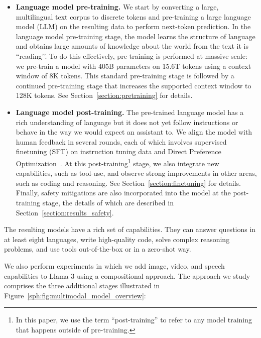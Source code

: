 \begin{itemize}

\item \textbf{Language model pre-training.} We start by converting a large, multilingual text corpus to discrete tokens and pre-training a large language model (LLM) on the resulting data to perform next-token prediction. In the language model pre-training stage, the model learns the structure of language and obtains large amounts of knowledge about the world from the text it is ``reading’’. To do this effectively, pre-training is performed at massive scale: we pre-train a model with 405B parameters on 15.6T tokens using a context window of 8K tokens. This standard pre-training stage is followed by a continued pre-training stage that increases the supported context window to 128K tokens. See Section~\ref{section:pretraining} for details.

\item \textbf{Language model post-training.} The pre-trained language model has a rich understanding of language but it does not yet follow instructions or behave in the way we would expect an assistant to. We align the model with human feedback in several rounds, each of which involves supervised finetuning (SFT) on instruction tuning data and Direct Preference Optimization~\citep[DPO;][]{rafailov2024direct}. At this post-training\footnote{In this paper, we use the term ``post-training'' to refer to any model training that happens outside of pre-training.} stage, we also integrate new capabilities, such as tool-use, and observe strong improvements in other areas, such as coding and reasoning. See Section~\ref{section:finetuning} for details. Finally, safety mitigations are also incorporated into the model at the post-training stage, the details of which are described in Section~\ref{section:results_safety}. 

\end{itemize}

The resulting models have a rich set of capabilities. They can answer questions in at least eight languages, write high-quality code, solve complex reasoning problems, and use tools out-of-the-box or in a zero-shot way.

We also perform experiments in which we add image, video, and speech capabilities to Llama 3 using a compositional approach. The approach we study comprises the three additional stages illustrated in Figure~\ref{sph:fig:multimodal_model_overview}:

